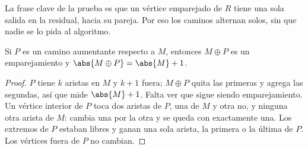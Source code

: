 \documentclass[11pt,letterpaper]{article}
\begin{document}
La frase clave de la prueba es que un vértice emparejado de $R$ tiene
una sola salida en la residual, hacia su pareja. Por eso los caminos
alternan solos, sin que nadie se lo pida al algoritmo.

\begin{lema}
  \label{lem:emparejamiento-diferencia}
  Si $P$ es un camino aumentante respecto a $M$, entonces
  $M \oplus P$ es un emparejamiento y
  $\abs{M \oplus P} = \abs{M} + 1$.
\end{lema}

\begin{proof}
  $P$ tiene $k$ aristas en $M$ y $k + 1$ fuera; $M \oplus P$ quita las
  primeras y agrega las segundas, así que mide $\abs{M} + 1$. Falta
  ver que sigue siendo emparejamiento. Un vértice interior de $P$ toca
  dos aristas de $P$, una de $M$ y otra no, y ninguna otra arista de
  $M$: cambia una por la otra y se queda con exactamente una. Los
  extremos de $P$ estaban libres y ganan una sola arista, la primera
  o la última de $P$. Los vértices fuera de $P$ no cambian.
\end{proof}
\end{document}
